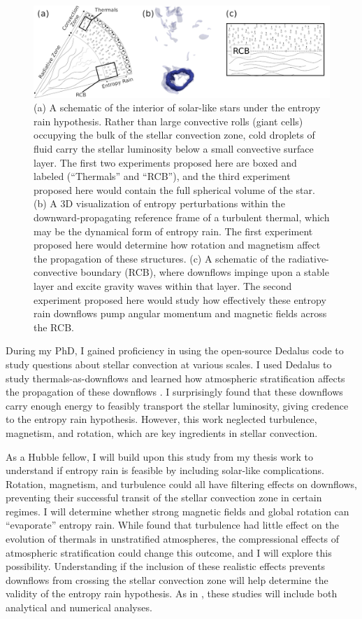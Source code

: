 \documentclass[11pt, preprint, hmargin=1in, vmargin=1in]{aastex62}
\begin{document}
\begin{figure}[t]
    \includegraphics[width=\textwidth]{./figs/tri_panel.png}
    \caption{ (a) A schematic of the interior of solar-like stars under the entropy rain hypothesis.
	Rather than large convective rolls (giant cells) occupying the bulk of the stellar convection zone, cold droplets of fluid carry the stellar luminosity below a small convective surface layer.
	The first two experiments proposed here are boxed and labeled (``Thermals'' and ``RCB''), and the third experiment proposed here would contain the full spherical volume of the star.
	(b) A 3D visualization of entropy perturbations within the downward-propagating reference frame of a turbulent thermal, which may be the dynamical form of entropy rain.
	The first experiment proposed here would determine how rotation and magnetism affect the propagation of these structures.
	(c) A schematic of the radiative-convective boundary (RCB), where downflows impinge upon a stable layer and excite gravity waves within that layer.
	The second experiment proposed here would study how effectively these entropy rain downflows pump angular momentum and magnetic fields across the RCB.
	\label{fig:tri_panel} }
\end{figure}


During my PhD, I gained proficiency in using the open-source Dedalus \citep{burns&all2019} code to study questions about stellar convection at various scales.
I used Dedalus to study thermals-as-downflows and learned how atmospheric stratification affects the propagation of these downflows \citep{andersLB2019}.
I surprisingly found that these downflows carry enough energy to feasibly transport the stellar luminosity, giving credence to the entropy rain hypothesis.
However, this work neglected turbulence, magnetism, and rotation, which are key ingredients in stellar convection.

As a Hubble fellow, I will build upon this study from my thesis work to understand if entropy rain is feasible by including solar-like complications.
Rotation, magnetism, and turbulence could all have filtering effects on downflows, preventing their successful transit of the stellar convection zone in certain regimes.
I will determine whether strong magnetic fields and global rotation can ``evaporate'' entropy rain.
While \citet{lecoanet&jeevanjee2019} found that turbulence had little effect on the evolution of thermals in unstratified atmospheres, the compressional effects of atmospheric stratification could change this outcome, and I will explore this possibility.
Understanding if the inclusion of these realistic effects prevents downflows from crossing the stellar convection zone will help determine the validity of the entropy rain hypothesis.
As in \citet{andersLB2019}, these studies will include both analytical and numerical analyses.
\end{document}
